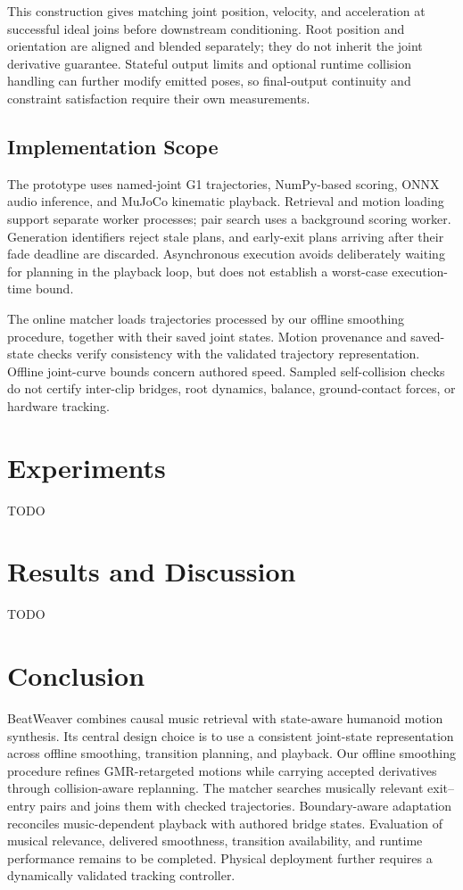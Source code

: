 \documentclass[conference]{IEEEtran}
\begin{document}
This construction gives matching joint position, velocity, and acceleration
at successful ideal joins before downstream conditioning. Root position and
orientation are aligned and blended separately; they do not inherit the joint
derivative guarantee. Stateful output limits and optional runtime collision
handling can further modify emitted poses, so final-output continuity and
constraint satisfaction require their own measurements.

\subsection{Implementation Scope}
The prototype uses named-joint G1 trajectories, NumPy-based scoring, ONNX audio
inference, and MuJoCo kinematic playback. Retrieval and motion loading support
separate worker processes; pair search uses a background scoring worker.
Generation identifiers reject stale plans, and early-exit plans arriving after
their fade deadline are discarded. Asynchronous execution avoids deliberately
waiting for planning in the playback loop, but does not establish a worst-case
execution-time bound.

The online matcher loads trajectories processed by our offline smoothing
procedure, together with their saved joint states. Motion provenance and
saved-state checks verify consistency with the validated trajectory
representation. Offline joint-curve bounds concern authored speed. Sampled
self-collision checks do not certify inter-clip bridges, root dynamics,
balance, ground-contact forces, or hardware tracking.

\section{Experiments}
\label{sec:experiments}
TODO

\section{Results and Discussion}
\label{sec:results}
TODO

\section{Conclusion}
BeatWeaver combines causal music retrieval with state-aware humanoid motion
synthesis. Its central design choice is to use a consistent joint-state
representation across offline smoothing, transition planning, and playback.
Our offline smoothing procedure refines GMR-retargeted motions while carrying
accepted derivatives through collision-aware replanning. The matcher searches musically relevant
exit--entry pairs and joins them with checked trajectories. Boundary-aware
adaptation reconciles music-dependent playback with authored bridge states.
Evaluation of musical relevance, delivered smoothness, transition availability,
and runtime performance remains to be completed. Physical deployment further
requires a dynamically validated tracking controller.

\balance


\end{document}
